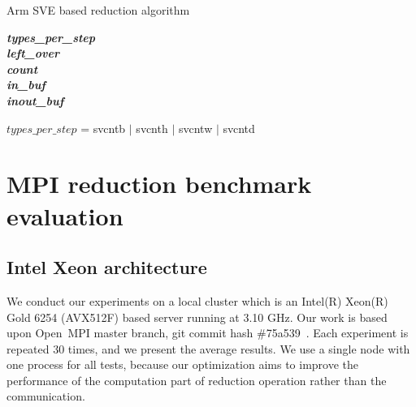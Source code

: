 \documentclass[5p,times,twocolumn]{elsarticle}
\newcommand{\ompi}[0]{Open~MPI\xspace}
\begin{document}
\begin{algorithm}[ht]
\caption{Arm SVE based reduction algorithm}\label{fig:svereducealgorithm}

\textbf{\textit{types\_per\_step}} \\
\textbf{\textit{left\_over}} \\
\textbf{\textit{count}} \\
\textbf{\textit{in\_buf}} \\
\textbf{\textit{inout\_buf}} \\

\begin{algorithmic}[1]
  \State $types\_per\_step$ = svcntb $\mid$ svcnth $\mid$ svcntw $\mid$ svcntd
\EndFor
{}
\EndIf
\EndProcedure
\end{algorithmic}
\end{algorithm}

\section{MPI reduction benchmark evaluation}\label{sec:experiments}
\subsection{Intel Xeon architecture}
We conduct our experiments on a local cluster which is an Intel(R)
Xeon(R) Gold 6254 (AVX512F) based server running at 3.10 GHz. Our work is based
upon \ompi master branch, git commit hash \#75a539~\cite{ompigit}. Each experiment is
repeated 30 times, and we present the average results.
We use a single node with one
process for all tests, because our optimization aims to improve the performance of
the computation part of reduction operation rather than the
communication.
\end{document}
